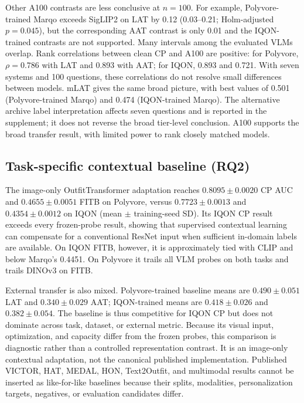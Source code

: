 \documentclass[pdflatex,sn-mathphys-num,iicol]{sn-jnl}
\begin{document}
Other A100 contrasts are less conclusive at $n=100$. For example, Polyvore-trained Marqo exceeds SigLIP2 on LAT by 0.12 (0.03--0.21; Holm-adjusted $p=0.045$), but the corresponding AAT contrast is only 0.01 and the IQON-trained contrasts are not supported. Many intervals among the evaluated VLMs overlap. Rank correlations between clean CP and A100 are positive: for Polyvore, $\rho=0.786$ with LAT and 0.893 with AAT; for IQON, 0.893 and 0.721. With seven systems and 100 questions, these correlations do not resolve small differences between models. mLAT gives the same broad picture, with best values of 0.501 (Polyvore-trained Marqo) and 0.474 (IQON-trained Marqo). The alternative archive label interpretation affects seven questions and is reported in the supplement; it does not reverse the broad tier-level conclusion. A100 supports the broad transfer result, with limited power to rank closely matched models.

\subsection{Task-specific contextual baseline (RQ2)}\label{sec:baseline}

The image-only OutfitTransformer adaptation reaches $0.8095\pm0.0020$ CP AUC and $0.4655\pm0.0051$ FITB on Polyvore, versus $0.7723\pm0.0013$ and $0.4354\pm0.0012$ on IQON (mean $\pm$ training-seed SD). Its IQON CP result exceeds every frozen-probe result, showing that supervised contextual learning can compensate for a conventional ResNet input when sufficient in-domain labels are available. On IQON FITB, however, it is approximately tied with CLIP and below Marqo's 0.4451. On Polyvore it trails all VLM probes on both tasks and trails DINOv3 on FITB.

External transfer is also mixed. Polyvore-trained baseline means are $0.490\pm0.051$ LAT and $0.340\pm0.029$ AAT; IQON-trained means are $0.418\pm0.026$ and $0.382\pm0.054$. The baseline is thus competitive for IQON CP but does not dominate across task, dataset, or external metric. Because its visual input, optimization, and capacity differ from the frozen probes, this comparison is diagnostic rather than a controlled representation contrast. It is an image-only contextual adaptation, not the canonical published implementation. Published VICTOR, HAT, MEDAL, HON, Text2Outfit, and multimodal results cannot be inserted as like-for-like baselines because their splits, modalities, personalization targets, negatives, or evaluation candidates differ.
\end{document}

